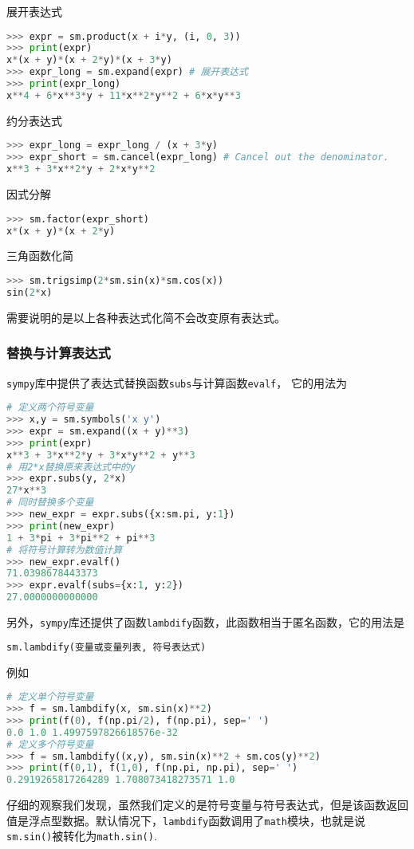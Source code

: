 展开表达式
\begin{lstlisting}[language=python]
>>> expr = sm.product(x + i*y, (i, 0, 3))
>>> print(expr)
x*(x + y)*(x + 2*y)*(x + 3*y)
>>> expr_long = sm.expand(expr) # 展开表达式
>>> print(expr_long)
x**4 + 6*x**3*y + 11*x**2*y**2 + 6*x*y**3
\end{lstlisting}

约分表达式
\begin{lstlisting}[language=python]
>>> expr_long = expr_long / (x + 3*y)
>>> expr_short = sm.cancel(expr_long) # Cancel out the denominator.
x**3 + 3*x**2*y + 2*x*y**2
\end{lstlisting}

因式分解
\begin{lstlisting}[language=python]
>>> sm.factor(expr_short) 
x*(x + y)*(x + 2*y)

\end{lstlisting}

三角函数化简
\begin{lstlisting}[language=python]
>>> sm.trigsimp(2*sm.sin(x)*sm.cos(x))
sin(2*x)
\end{lstlisting}
需要说明的是以上各种表达式化简不会改变原有表达式。

\subsubsection{替换与计算表达式}
\verb|sympy|库中提供了表达式替换函数\verb|subs|与计算函数\verb|evalf|， 它的用法为
\begin{lstlisting}[language=python]
# 定义两个符号变量
>>> x,y = sm.symbols('x y')
>>> expr = sm.expand((x + y)**3)
>>> print(expr)
x**3 + 3*x**2*y + 3*x*y**2 + y**3
# 用2*x替换原来表达式中的y
>>> expr.subs(y, 2*x)
27*x**3
# 同时替换多个变量
>>> new_expr = expr.subs({x:sm.pi, y:1})
>>> print(new_expr)
1 + 3*pi + 3*pi**2 + pi**3
# 将符号计算转为数值计算
>>> new_expr.evalf() 
71.0398678443373
>>> expr.evalf(subs={x:1, y:2})
27.0000000000000
\end{lstlisting}
另外，\verb|sympy|库还提供了函数\verb|lambdify|函数，此函数相当于匿名函数，它的用法是
\begin{lstlisting}[language=python]
 sm.lambdify(变量或变量列表, 符号表达式)
\end{lstlisting}
例如
\begin{lstlisting}[language=python]
# 定义单个符号变量
>>> f = sm.lambdify(x, sm.sin(x)**2)
>>> print(f(0), f(np.pi/2), f(np.pi), sep=' ')
0.0 1.0 1.4997597826618576e-32
# 定义多个符号变量
>>> f = sm.lambdify((x,y), sm.sin(x)**2 + sm.cos(y)**2)
>>> print(f(0,1), f(1,0), f(np.pi, np.pi), sep=' ')
0.2919265817264289 1.708073418273571 1.0
\end{lstlisting}
仔细的观察我们发现，虽然我们定义的是符号变量与符号表达式，但是该函数返回值是浮点型数据。默认情况下，\verb|lambdify|函数调用了\verb|math|模块，也就是说\verb|sm.sin()|被转化为\verb|math.sin()|.

